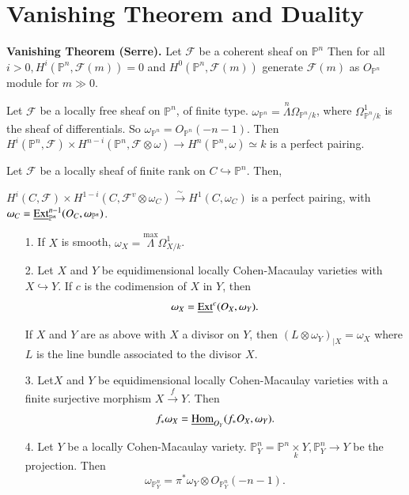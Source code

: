 \section{Vanishing Theorem and Duality}\label{chap1:sec3}

{\bf Vanishing Theorem (Serre).} Let $\mathcal{F}$ be a coherent sheaf
on $\mathbb{P}^n$ Then for all $i>0,
H^i(\mathbb{P}^n,\mathcal{F}(m))=0$ and
$H^0(\mathbb{P}^n,\mathcal{F}(m))$ generate $\mathcal{F}(m)$ as
$O_{\mathbb{P}^n}$ module for $m\gg 0$. 

\medskip
{} Let $\mathcal{F}$ be a locally free
sheaf on $\mathbb{P}^n$, of finite
type. $\omega_{\mathbb{P}^n} = \overset{n}{\Lambda}
\Omega_{\mathbb{P}^n/k}$, where $\Omega_{\mathbb{P}^n/k}^1$ is the
sheaf of differentials. So
$\omega_{\mathbb{P}^n}=O_{\mathbb{P}^n}(-n-1)$. Then $H^i
(\mathbb{P}^n,\mathcal{F})\times H^{n-i}(\mathbb{P}^n,\mathcal{F}
\otimes\omega)\longrightarrow H^n(\mathbb{P}^n,\omega)\simeq k$ is a
perfect pairing.

\medskip
{} Let
$\mathcal{F}$ be a locally sheaf of finite rank on $C\hookrightarrow
\mathbb{P}^n$. Then,

$H^i(C,\mathcal{F})\times H^{1-i}(C,\mathcal{F}^v\otimes\omega_C)
\xrightarrow{\sim}H^1(C,\omega_C)$ is a perfect pairing,
with $\omega_C=\underline{\operatorname{Ext}}_{\mathbb{P}^n}^{n-1}
(O_C,\omega_{\mathbb{P}^n})$. 
\begin{itemize}
\item [1.] If $X$ is smooth, $\omega_X=\overset{\max}{\Lambda}
\Omega_{X/k}^1$. 
\item [2.] Let $X$ and $Y$ be equidimensional locally Cohen-Macaulay
  varieties with $X\hookrightarrow Y$. If $c$ is the codimension of
  $X$ in $Y$, then
$$
\omega_X=\underline{\operatorname{Ext}}^c(O_X,\omega_Y).
$$

\begin{Coro*}
If $X$ and $Y$ are as above with $X$ a divisor on $Y$, then $(L\otimes
\omega_Y)_{|X}=\omega_X$ where $L$ is the line bundle associated to
the divisor $X$.
\end{Coro*}

\item [3.] Let\pageoriginale $X$ and $Y$ be equidimensional locally
  Cohen-Macaulay varieties with a finite surjective morphism
  $X\xrightarrow{f}Y$. Then
$$
f_*\omega_X=\underline{\operatorname{Hom}}_{O_Y}(f_*O_X,\omega_Y).
$$
\item [4.] Let $Y$ be a locally Cohen-Macaulay
  variety. $\mathbb{P}_Y^n=\mathbb{P}^n \underset{k}{\times}Y,
\mathbb{P}_Y^n\longrightarrow Y$ be the projection. Then 
$$
\omega_{\mathbb{P}_Y^n}=\pi^*\omega_Y\otimes O_{\mathbb{P}_Y^n}(-n-1).
$$
\end{itemize}

